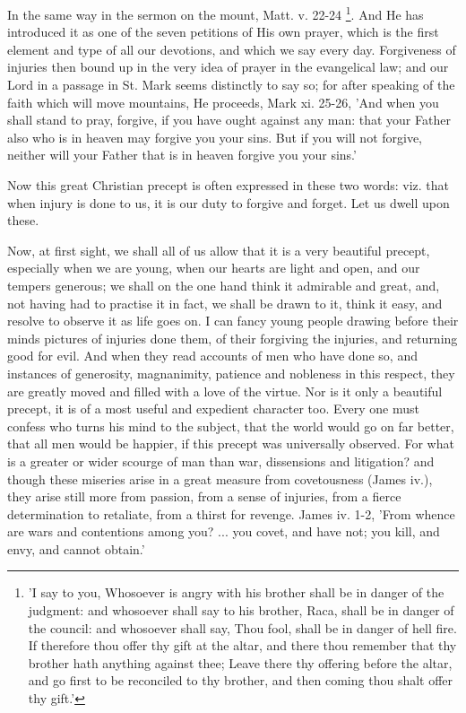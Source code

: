 In the same way in the sermon on the mount, Matt.
v. 22-24 \footnote{'I say to you, Whosoever
is angry with his brother shall be in danger of the judgment: and
whosoever shall say to his brother, Raca, shall be in danger of the
council: and whosoever shall say, Thou fool, shall be in danger of
hell fire. If therefore thou offer thy gift at the altar, and there
thou remember that thy brother hath anything against thee; Leave there
thy offering before the altar, and go first to be reconciled to thy
brother, and then coming thou shalt offer thy gift.'}. And He has
introduced it as one of the seven petitions of His own prayer, which
is the first element and type of all our devotions, and which we say
every day. Forgiveness of injuries then bound up in the very idea of
prayer in the evangelical law; and our Lord in a passage in St. Mark
seems distinctly to say so; for after speaking of the faith which will
move mountains, He proceeds, Mark xi. 25-26, 'And when you shall stand
to pray, forgive, if you have ought against any man: that your Father
also who is in heaven may forgive you your sins. But if you will not
forgive, neither will your Father that is in heaven forgive you your
sins.'

Now this great Christian precept is often
expressed in these two words: viz. that when injury is done to us, it
is our duty to forgive and forget. Let us dwell upon these.

Now, at first sight, we shall all of us allow
that it is a very beautiful precept, especially when we are young,
when our hearts are light and open, and our tempers generous; we shall
on the one hand think it admirable and great, and, not having had to
practise it in fact, we shall be drawn to it, think it easy, and
resolve to observe it as life goes on. I can fancy young people
drawing before their minds pictures of injuries done them, of their
forgiving the injuries, and returning good for evil. And when they
read accounts of men who have done so, and instances of generosity,
magnanimity, patience and nobleness in this respect, they are greatly
moved and filled with a love of the virtue. Nor is it only a beautiful
precept, it is of a most useful and expedient character too. Every one
must confess who turns his mind to the subject, that the world would
go on far better, that all men would be happier, if this precept was
universally observed. For what is a greater or wider scourge of man
than war, dissensions and litigation? and though these miseries arise
in a great measure from covetousness (James iv.), they arise still
more from passion, from a sense of injuries, from a fierce
determination to retaliate, from a thirst for revenge. James iv. 1-2,
'From whence are wars and contentions among you? ... you covet, and
have not; you kill, and envy, and cannot obtain.'

